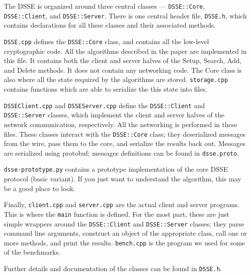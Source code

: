 The DSSE is organized around three central classes ---
\texttt{DSSE::Core}, \texttt{DSSE::Client}, and \texttt{DSSE::Server}.
There is one central header file, \texttt{DSSE.h},
which contains declarations for all these classes and their associated methods.


\texttt{DSSE.cpp} defines the \texttt{DSSE::Core} class, and
contains all the low-level cryptographic code.
All the algorithms described in the paper are implemented in this file.
It contains both the client and server halves of the Setup, Search, Add, and Delete methods.
It does not contain any networking code.
The Core class is also where all the state required by the algorithms are stored.
\texttt{storage.cpp} contains functions which are able to serialize the this state into files.

\texttt{DSSEClient.cpp} and \texttt{DSSEServer.cpp} define the
\texttt{DSSE::Client} and \texttt{DSSE::Server} classes,
which implement the client and server halves of the network communication, respectively.
All the networking is performed in these files.
These classes interact with the \texttt{DSSE::Core} class;
they deserialized messages from the wire, pass them to the core, and serialize the results back out.
Messages are serialized using protobuf; messages definitions can be found in \texttt{dsse.proto}.

\texttt{dsse-prototype.py} contains a prototype implementation of the core DSSE protocol (basic variant).
If you just want to understand the algorithm, this may be a good place to look.

Finally, \texttt{client.cpp} and \texttt{server.cpp} are the
actual client and server programs. This is where the \texttt{main} function is
defined.
For the most part, these are just simple wrappers around the
\texttt{DSSE::Client} and \texttt{DSSE::Server} classes;
they parse command line arguments, construct an object of the appropriate class,
call one or more methods, and print the results.
\texttt{bench.cpp} is the program we used for some of the benchmarks.

Further details and documentation of the classes can be found in \texttt{DSSE.h}.
